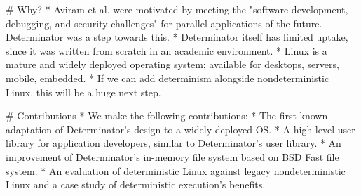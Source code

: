 # Why?
* Aviram et al. were motivated by meeting the "software development, debugging,
  and security challenges" for parallel applications of the future. Determinator
  was a step towards this.
* Determinator itself has limited uptake, since it was written from scratch in
  an academic environment.
* Linux is a mature and widely deployed operating system; available for
  desktops, servers, mobile, embedded.
* If we can add determinism alongside nondeterministic Linux, this will be a
  huge next step.

# Contributions
* We make the following contributions:
* The first known adaptation of Determinator's design to a widely deployed OS.
* A high-level user library for application developers, similar to
  Determinator's user library.
* An improvement of Determinator's in-memory file system based on BSD Fast
  file system.
* An evaluation of deterministic Linux against legacy nondeterministic Linux and
  a case study of deterministic execution's benefits.
\fi

\endinput



